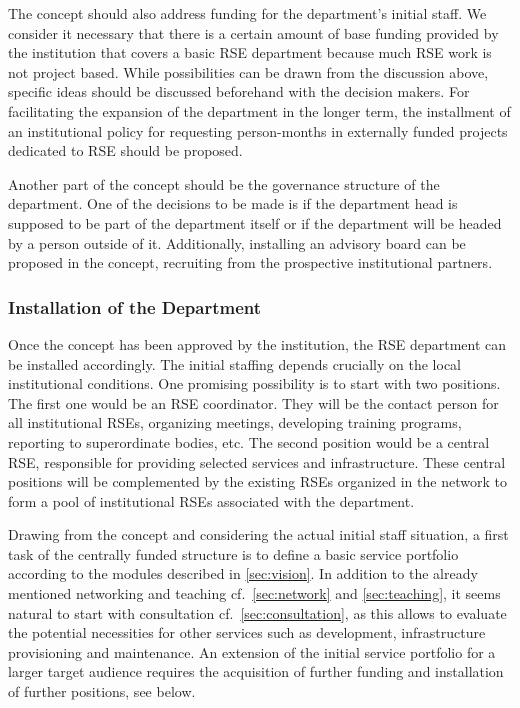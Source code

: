 \documentclass[a4paper]{article}
\begin{document}
The concept should also address funding for the department's initial staff.
We consider it necessary that there is a certain amount of base funding provided by the institution that covers a basic RSE department because much RSE work is not project based.
While possibilities can be drawn from the discussion above, specific ideas should be discussed beforehand with the decision makers.
For facilitating the expansion of the department in the longer term, the installment of an institutional policy for requesting person-months in externally funded projects dedicated to RSE should be proposed.

Another part of the concept should be the governance structure of the department.
One of the decisions to be made is if the department head is supposed to be part of the department itself or if the department will be headed by a person outside of it.
Additionally, installing an advisory board can be proposed in the concept, recruiting from the prospective institutional partners.

\subsubsection{Installation of the Department}
Once the concept has been approved by the institution, the RSE department can be installed accordingly.
The initial staffing depends crucially on the local institutional conditions. 
One promising possibility is to start with two positions. The first one would be an RSE coordinator.
They will be the contact person for all institutional RSEs, organizing meetings, developing training programs, reporting to superordinate bodies, etc.
The second position would be a central RSE, responsible for providing selected services and infrastructure.
These central positions will be complemented by the existing RSEs organized in the network to form a pool of institutional RSEs associated with the department.

Drawing from the concept and considering the actual initial staff situation, a first task of the centrally funded structure is to define a basic service portfolio according to the modules described in \autoref{sec:vision}.
In addition to the already mentioned networking and teaching cf.~\autoref{sec:network} and \autoref{sec:teaching}, it seems natural to start with consultation cf.~\autoref{sec:consultation},
as this allows to evaluate the potential necessities for other services such as development, infrastructure provisioning and maintenance.
An extension of the initial service portfolio for a larger target audience requires the acquisition of further funding and installation of further positions, see below.
\end{document}
